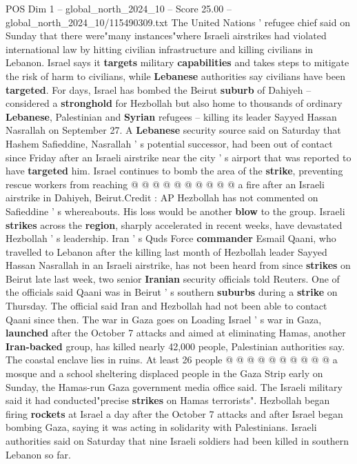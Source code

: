 \begin{textsample}{POS Dim 1 – global\_north\_2024\_10 – Score 25.00 – global\_north\_2024\_10/115490309.txt}
The United Nations ' refugee chief said on Sunday that there were"many instances"where Israeli airstrikes had violated international law by hitting civilian infrastructure and killing civilians in Lebanon.
Israel says it \textbf{targets} military \textbf{capabilities} and takes steps to mitigate the risk of harm to civilians, while \textbf{Lebanese} authorities say civilians have been \textbf{targeted}.
For days, Israel has bombed the Beirut \textbf{suburb} of Dahiyeh -- considered a \textbf{stronghold} for Hezbollah but also home to thousands of ordinary \textbf{Lebanese}, Palestinian and \textbf{Syrian} refugees -- killing its leader Sayyed Hassan Nasrallah on September 27.
A \textbf{Lebanese} security source said on Saturday that Hashem Safieddine, Nasrallah ' s potential successor, had been out of contact since Friday after an Israeli airstrike near the city ' s airport that was reported to have \textbf{targeted} him.
Israel continues to bomb the area of the \textbf{strike}, preventing rescue workers from reaching @ @ @ @ @ @ @ @ @ @ a fire after an Israeli airstrike in Dahiyeh, Beirut.Credit : AP Hezbollah has not commented on Safieddine ' s whereabouts.
His loss would be another \textbf{blow} to the group.
Israeli \textbf{strikes} across the \textbf{region}, sharply accelerated in recent weeks, have devastated Hezbollah ' s leadership.
Iran ' s Quds Force \textbf{commander} Esmail Qaani, who travelled to Lebanon after the killing last month of Hezbollah leader Sayyed Hassan Nasrallah in an Israeli airstrike, has not been heard from since \textbf{strikes} on Beirut late last week, two senior \textbf{Iranian} security officials told Reuters.
One of the officials said Qaani was in Beirut ' s southern \textbf{suburbs} during a \textbf{strike} on Thursday.
The official said Iran and Hezbollah had not been able to contact Qaani since then.
The war in Gaza goes on Loading Israel ' s war in Gaza, \textbf{launched} after the October 7 attacks and aimed at eliminating Hamas, another \textbf{Iran-backed} group, has killed nearly 42,000 people, Palestinian authorities say.
The coastal enclave lies in ruins.
At least 26 people @ @ @ @ @ @ @ @ @ @ a mosque and a school sheltering displaced people in the Gaza Strip early on Sunday, the Hamas-run Gaza government media office said.
The Israeli military said it had conducted"precise \textbf{strikes} on Hamas terrorists".
Hezbollah began firing \textbf{rockets} at Israel a day after the October 7 attacks and after Israel began bombing Gaza, saying it was acting in solidarity with Palestinians.
Israeli authorities said on Saturday that nine Israeli soldiers had been killed in southern Lebanon so far.

\end{textsample}
